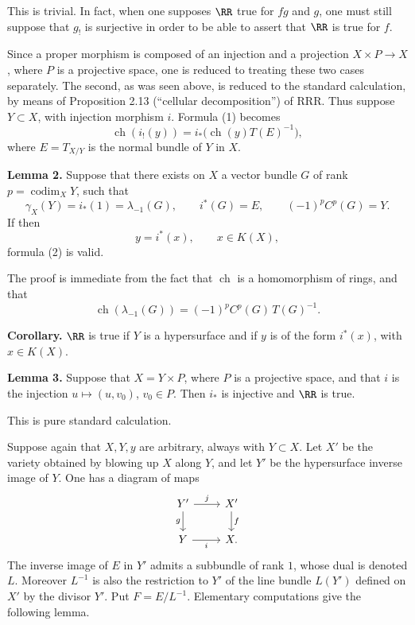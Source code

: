\documentclass[11pt]{article}
\newcommand{\ch}{\operatorname{ch}}
\newcommand{\RRR}{\mathrm{RRR}}
\providecommand{\codim}{\operatorname{codim}}
\providecommand{\ch}{\operatorname{ch}}
\providecommand{\codim}{\operatorname{codim}}
\begin{document}
This is trivial. In fact, when one supposes \(\RR\) true for \(fg\) and \(g\), one must still suppose that \(g_!\) is surjective in order to be able to assert that \(\RR\) is true for \(f\).

Since a proper morphism is composed of an injection and a projection \(X\times P\to X\), where \(P\) is a projective space, one is reduced to treating these two cases separately. The second, as was seen above, is reduced to the standard calculation, by means of Proposition 2.13 (``cellular decomposition'') of \(\RRR\). Thus suppose \(Y\subset X\), with injection morphism \(i\). Formula (1) becomes
\begin{equation}\tag{2}
  \ch(i_!(y))=i_*\bigl(\ch(y)T(E)^{-1}\bigr),
\end{equation}
where \(E=T_{X/Y}\) is the normal bundle of \(Y\) in \(X\).

\textbf{Lemma 2.} Suppose that there exists on \(X\) a vector bundle \(G\) of rank \(p=\codim_XY\), such that
\begin{equation}\tag{3}
  \gamma_X(Y)=i_*(1)=\lambda_{-1}(G),\qquad
  i^*(G)=E,\qquad
  (-1)^pC^p(G)=Y.
\end{equation}
If then
\begin{equation}\tag{4}
  y=i^*(x),\qquad x\in K(X),
\end{equation}
formula (2) is valid.

The proof is immediate from the fact that \(\ch\) is a homomorphism of rings, and that
\begin{equation}\tag{5}
  \ch(\lambda_{-1}(G))=(-1)^pC^p(G)\,T(G)^{-1}.
\end{equation}

\textbf{Corollary.} \(\RR\) is true if \(Y\) is a hypersurface and if \(y\) is of the form \(i^*(x)\), with \(x\in K(X)\).

\textbf{Lemma 3.} Suppose that \(X=Y\times P\), where \(P\) is a projective space, and that \(i\) is the injection \(u\mapsto (u,v_0)\), \(v_0\in P\). Then \(i_*\) is injective and \(\RR\) is true.

This is pure standard calculation.

Suppose again that \(X,Y,y\) are arbitrary, always with \(Y\subset X\). Let \(X'\) be the variety obtained by blowing up \(X\) along \(Y\), and let \(Y'\) be the hypersurface inverse image of \(Y\). One has a diagram of maps
\[
\begin{tikzcd}
Y' \arrow[r,"j"] \arrow[d,"g"'] & X' \arrow[d,"f"]\\
Y \arrow[r,"i"'] & X .
\end{tikzcd}
\]
The inverse image of \(E\) in \(Y'\) admits a subbundle of rank \(1\), whose dual is denoted \(L\). Moreover \(L^{-1}\) is also the restriction to \(Y'\) of the line bundle \(L(Y')\) defined on \(X'\) by the divisor \(Y'\). Put \(F=E/L^{-1}\). Elementary computations give the following lemma.
\end{document}
